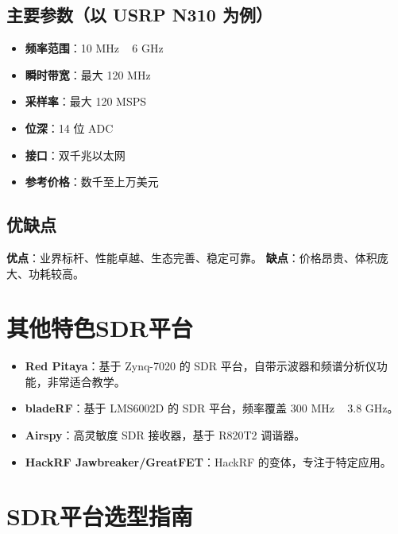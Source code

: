 \documentclass[12pt,UTF8]{ctexbook}
\begin{document}
\subsection{主要参数（以 USRP N310 为例）}
\begin{itemize}[leftmargin=2cm]
    \item \textbf{频率范围}：10 MHz ~ 6 GHz
    \item \textbf{瞬时带宽}：最大 120 MHz
    \item \textbf{采样率}：最大 120 MSPS
    \item \textbf{位深}：14 位 ADC
    \item \textbf{接口}：双千兆以太网
    \item \textbf{参考价格}：数千至上万美元
\end{itemize}

\subsection{优缺点}
\textbf{优点}：业界标杆、性能卓越、生态完善、稳定可靠。
\textbf{缺点}：价格昂贵、体积庞大、功耗较高。

\section{其他特色SDR平台}
\label{sec:other_sdr}

\begin{itemize}[leftmargin=2cm]
    \item \textbf{Red Pitaya}：基于 Zynq-7020 的 SDR 平台，自带示波器和频谱分析仪功能，非常适合教学。
    \item \textbf{bladeRF}：基于 LMS6002D 的 SDR 平台，频率覆盖 300 MHz ~ 3.8 GHz。
    \item \textbf{Airspy}：高灵敏度 SDR 接收器，基于 R820T2 调谐器。
    \item \textbf{HackRF Jawbreaker/GreatFET}：HackRF 的变体，专注于特定应用。
\end{itemize}

\section{SDR平台选型指南}
\label{sec:sdr_selection}
\end{document}
